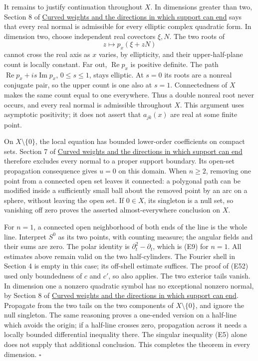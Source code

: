 \documentclass[
  11pt,
]{article}
\begin{document}
It remains to justify continuation throughout \(X\). In dimensions
greater than two, Section 8 of \href{support-continuation.pdf}{Curved
weights and the directions in which support can end} says that every
real normal is admissible for every elliptic complex quadratic form. In
dimension two, choose independent real covectors \(\xi,N\). The two
roots of \[
                       z\longmapsto p_x(\xi+zN)                 \tag{E72}
\] cannot cross the real axis as \(x\) varies, by ellipticity, and their
upper-half-plane count is locally constant. Far out,
\(\operatorname{Re}p_x\) is positive definite. The path
\(\operatorname{Re}p_x+i s\operatorname{Im}p_x\), \(0\leq s\leq1\),
stays elliptic. At \(s=0\) its roots are a nonreal conjugate pair, so
the upper count is one also at \(s=1\). Connectedness of \(X\) makes the
same count equal to one everywhere. Thus a double nonreal root never
occurs, and every real normal is admissible throughout \(X\). This
argument uses asymptotic positivity; it does not assert that
\(a_{jk}(x)\) are real at some finite point.

On \(X\setminus\{0\}\), the local equation has bounded lower-order
coefficients on compact sets. Section 7 of
\href{support-continuation.pdf}{Curved weights and the directions in
which support can end} therefore excludes every normal to a proper
support boundary. Its open-set propagation consequence gives \(u=0\) on
this domain. When \(n\geq2\), removing one point from a connected open
set leaves it connected: a polygonal path can be modified inside a
sufficiently small ball about the removed point by an arc on a sphere,
without leaving the open set. If \(0\in X\), its singleton is a null
set, so vanishing off zero proves the asserted almost-everywhere
conclusion on \(X\).

For \(n=1\), a connected open neighborhood of both ends of the line is
the whole line. Interpret \(S^0\) as its two points, with counting
measure; the angular fields and their sums are zero. The polar identity
is \(\partial_t^2-\partial_t\), which is (E9) for \(n=1\). All estimates
above remain valid on the two half-cylinders. The Fourier shell in
Section 4 is empty in this case; its off-shell estimate suffices. The
proof of (E52) used only boundedness of \(c\) and \(c'\), so also
applies. The two exterior tails vanish. In dimension one a nonzero
quadratic symbol has no exceptional nonzero normal, by Section 8 of
\href{support-continuation.pdf}{Curved weights and the directions in
which support can end}. Propagate from the two tails on the two
components of \(X\setminus\{0\}\), and ignore the null singleton. The
same reasoning proves a one-ended version on a half-line which avoids
the origin; if a half-line crosses zero, propagation across it needs a
locally bounded differential inequality there. The singular inequality
(E5) alone does not supply that additional conclusion. This completes
the theorem in every dimension. \(\square\)
\end{document}

